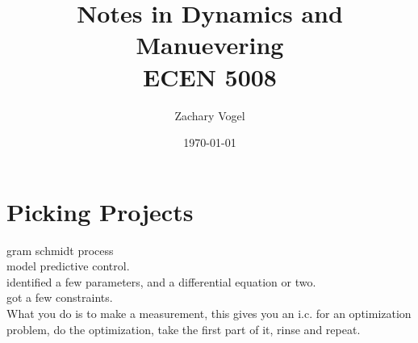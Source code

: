 \documentclass{article}
\author{Zachary Vogel}
\title{Notes in Dynamics and Manuevering\\ ECEN 5008}
\date{\today}
\begin{document}
\maketitle
\section{Picking Projects}
gram schmidt process\\

model predictive control.\\
identified a few parameters, and a differential equation or two.\\
got a few constraints.\\
What you do is to make a measurement, this gives you an i.c. for an optimization problem, do the optimization, take the first part of it, rinse and repeat.\\
\end{document}
